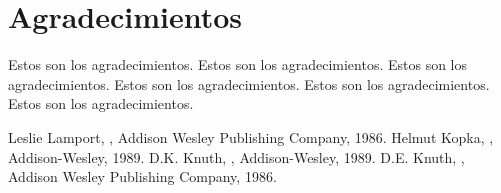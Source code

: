 \documentclass[twocolumn]{maeb2015}
\begin{document}
\section*{Agradecimientos}
Estos son los agradecimientos.
Estos son los agradecimientos.
Estos son los agradecimientos.
Estos son los agradecimientos.
Estos son los agradecimientos.
Estos son los agradecimientos.

\nocite{*}


\begin{thebibliography}{1}
Leslie Lamport,
,
\newblock Addison Wesley Publishing Company, 1986.
Helmut Kopka,
,
\newblock Addison-Wesley, 1989.
D.K. Knuth,
,
\newblock Addison-Wesley, 1989.
D.E. Knuth,
,
\newblock Addison Wesley Publishing Company, 1986.
\end{thebibliography}
\end{document}
